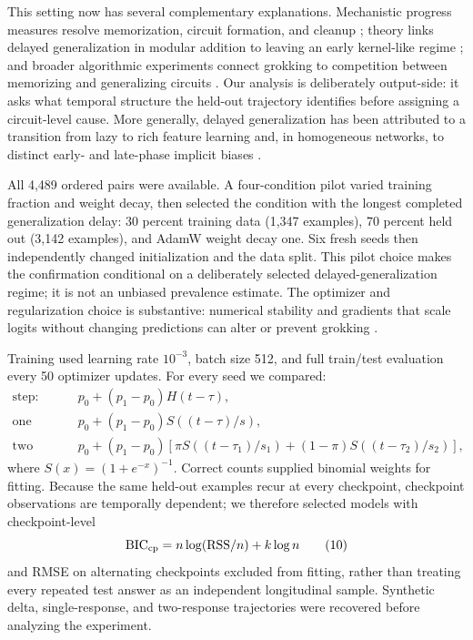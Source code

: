 \documentclass[10pt]{article}
\theoremstyle{compact}
\begin{document}
This setting now has several complementary explanations. Mechanistic progress
measures resolve memorization, circuit formation, and cleanup
\cite{nanda2023}; theory links delayed generalization in modular addition to
leaving an early kernel-like regime \cite{mohamadi2024}; and broader algorithmic
experiments connect grokking to competition between memorizing and generalizing
circuits \cite{huang2024}. Our analysis is deliberately output-side: it asks
what temporal structure the held-out trajectory identifies before assigning a
circuit-level cause.
More generally, delayed generalization has been attributed to a transition from
lazy to rich feature learning \cite{kumar2024} and, in homogeneous networks, to
distinct early- and late-phase implicit biases \cite{lyu2024}.

All 4,489 ordered pairs were available. A four-condition pilot varied training
fraction and weight decay, then selected the condition with the longest
completed generalization delay: 30 percent training data (1,347 examples),
70 percent held out (3,142 examples), and AdamW weight decay one. Six fresh
seeds then independently changed initialization and the data split. This
pilot choice makes the confirmation conditional on a deliberately selected
delayed-generalization regime; it is not an unbiased prevalence estimate.
The optimizer and regularization choice is substantive: numerical stability and
gradients that scale logits without changing predictions can alter or prevent
grokking \cite{prieto2025}.

Training used learning rate \(10^{-3}\), batch size 512, and full train/test
evaluation every 50 optimizer updates. For every seed we compared:
\[
\begin{array}{ll}
\text{step:}&p_0+(p_1-p_0)H(t-\tau),\\
\text{one response:}&p_0+(p_1-p_0)S((t-\tau)/s),\\
\text{two responses:}&p_0+(p_1-p_0)
[\pi S((t-\tau_1)/s_1)+(1-\pi)S((t-\tau_2)/s_2)],
\end{array}
\tag{9}
\]
where \(S(x)=(1+e^{-x})^{-1}\). Correct counts supplied binomial weights for
fitting. Because the same held-out examples recur at every checkpoint,
checkpoint observations are temporally dependent; we therefore selected
models with checkpoint-level
\[
\mathrm{BIC}_{\rm cp}=n\log(\mathrm{RSS}/n)+k\log n
\tag{10}
\]
and RMSE on alternating checkpoints excluded from fitting, rather than
treating every repeated test answer as an independent longitudinal sample.
Synthetic delta, single-response, and two-response trajectories were recovered
before analyzing the experiment.
\end{document}
